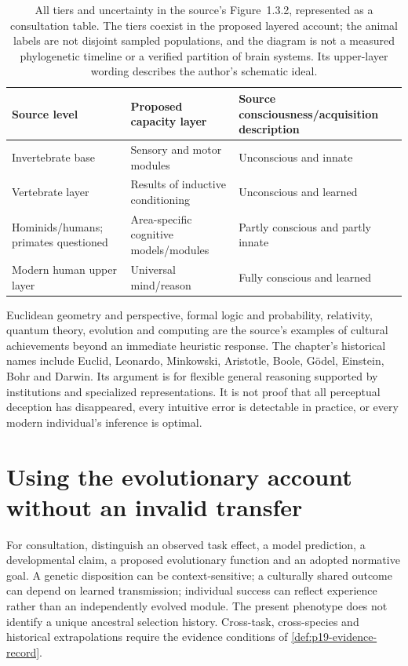 \begin{table}[htbp]
\centering\small
\begin{tabularx}{\textwidth}{@{}l X X@{}}
\toprule
Source level & Proposed capacity layer & Source consciousness/acquisition description \\
\midrule
Invertebrate base & Sensory and motor modules & Unconscious and innate \\
Vertebrate layer & Results of inductive conditioning & Unconscious and learned \\
Hominids/humans; primates questioned & Area-specific cognitive models/modules & Partly conscious and partly innate \\
Modern human upper layer & Universal mind/reason & Fully conscious and learned \\
\bottomrule
\end{tabularx}
\caption{All tiers and uncertainty in the source's Figure~1.3.2, represented
as a consultation table. The tiers coexist in the proposed layered account;
the animal labels are not disjoint sampled populations, and the diagram
is not a measured phylogenetic timeline or a verified partition of brain
systems. Its upper-layer wording describes the author's schematic ideal.}
\label{tab:p19-r13-architecture}
\end{table}

Euclidean geometry and perspective, formal logic and probability, relativity,
quantum theory, evolution and computing are the source's examples of cultural
achievements beyond an immediate heuristic response. The chapter's historical
names include Euclid, Leonardo, Minkowski, Aristotle, Boole, G\"odel,
Einstein, Bohr and Darwin. Its argument is for flexible general reasoning
supported by institutions and specialized representations. It is not proof
that all perceptual deception has disappeared, every intuitive error is
detectable in practice, or every modern individual's inference is optimal.

\section{Using the evolutionary account without an invalid transfer}

For consultation, distinguish an observed task effect, a model prediction,
a developmental claim, a proposed evolutionary function and an adopted
normative goal. A genetic disposition can be context-sensitive; a culturally
shared outcome can depend on learned transmission; individual success can
reflect experience rather than an independently evolved module. The present
phenotype does not identify a unique ancestral selection history. Cross-task,
cross-species and historical extrapolations require the evidence conditions
of \cref{def:p19-evidence-record}.

